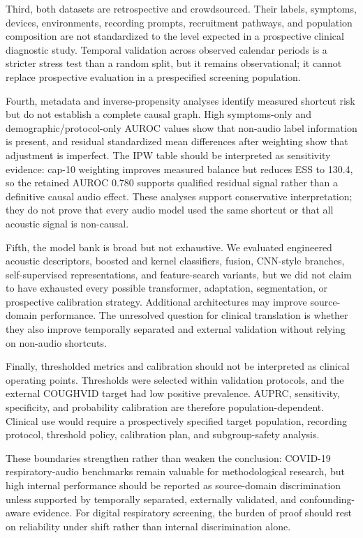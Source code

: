 \documentclass[11pt]{article}
\begin{document}
Third, both datasets are retrospective and crowdsourced. Their labels, symptoms, devices, environments, recording prompts, recruitment pathways, and population composition are not standardized to the level expected in a prospective clinical diagnostic study. Temporal validation across observed calendar periods is a stricter stress test than a random split, but it remains observational; it cannot replace prospective evaluation in a prespecified screening population.

Fourth, metadata and inverse-propensity analyses identify measured shortcut risk but do not establish a complete causal graph. High symptoms-only and demographic/protocol-only AUROC values show that non-audio label information is present, and residual standardized mean differences after weighting show that adjustment is imperfect. The IPW table should be interpreted as sensitivity evidence: cap-10 weighting improves measured balance but reduces ESS to 130.4, so the retained AUROC 0.780 supports qualified residual signal rather than a definitive causal audio effect. These analyses support conservative interpretation; they do not prove that every audio model used the same shortcut or that all acoustic signal is non-causal.

Fifth, the model bank is broad but not exhaustive. We evaluated engineered acoustic descriptors, boosted and kernel classifiers, fusion, CNN-style branches, self-supervised representations, and feature-search variants, but we did not claim to have exhausted every possible transformer, adaptation, segmentation, or prospective calibration strategy. Additional architectures may improve source-domain performance. The unresolved question for clinical translation is whether they also improve temporally separated and external validation without relying on non-audio shortcuts.

Finally, thresholded metrics and calibration should not be interpreted as clinical operating points. Thresholds were selected within validation protocols, and the external COUGHVID target had low positive prevalence. AUPRC, sensitivity, specificity, and probability calibration are therefore population-dependent. Clinical use would require a prospectively specified target population, recording protocol, threshold policy, calibration plan, and subgroup-safety analysis.

These boundaries strengthen rather than weaken the conclusion: COVID-19 respiratory-audio benchmarks remain valuable for methodological research, but high internal performance should be reported as source-domain discrimination unless supported by temporally separated, externally validated, and confounding-aware evidence. For digital respiratory screening, the burden of proof should rest on reliability under shift rather than internal discrimination alone.
\end{document}
